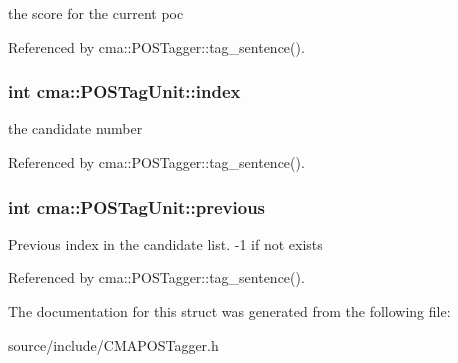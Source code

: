 the score for the current poc 

Referenced by cma::POSTagger::tag\_\-sentence().
\subsubsection{\setlength{\rightskip}{0pt plus 5cm}int {\bf cma::POSTagUnit::index}}\label{structcma_1_1POSTagUnit_982a3b0932a72ce0a96de0bb24f6d849}


the candidate number 

Referenced by cma::POSTagger::tag\_\-sentence().
\subsubsection{\setlength{\rightskip}{0pt plus 5cm}int {\bf cma::POSTagUnit::previous}}\label{structcma_1_1POSTagUnit_f11c0faeb5fb6c58348768403a9714a9}


Previous index in the candidate list. -1 if not exists 

Referenced by cma::POSTagger::tag\_\-sentence().

The documentation for this struct was generated from the following file:\begin{CompactItemize}
\item 
source/include/CMAPOSTagger.h\end{CompactItemize}

